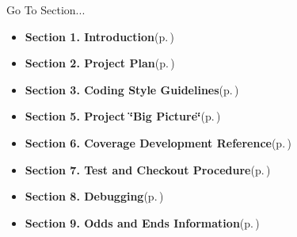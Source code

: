 \begin{Desc}
\item[Go To Section...]\begin{itemize}
\item {\bf Section 1.  Introduction}{\rm (p.\,\pageref{page_intro})}\item {\bf Section 2.  Project Plan}{\rm (p.\,\pageref{page_project_plan})}\item {\bf Section 3.  Coding Style Guidelines}{\rm (p.\,\pageref{page_code_style})}\item {\bf Section 5.  Project \char`\"{}Big Picture\char`\"{}}{\rm (p.\,\pageref{page_big_picture})}\item {\bf Section 6.  Coverage Development Reference}{\rm (p.\,\pageref{page_code_details})}\item {\bf Section 7.  Test and Checkout Procedure}{\rm (p.\,\pageref{page_testing})}\item {\bf Section 8.  Debugging}{\rm (p.\,\pageref{page_debugging})}\item {\bf Section 9.  Odds and Ends Information}{\rm (p.\,\pageref{page_misc})} \end{itemize}
\end{Desc}
